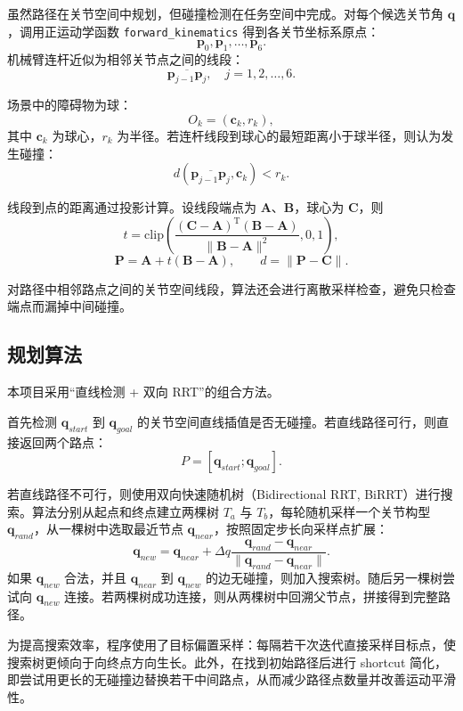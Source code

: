 \documentclass[UTF8,a4paper,12pt]{ctexart}
\begin{document}
虽然路径在关节空间中规划，但碰撞检测在任务空间中完成。对每个候选关节角 $\mathbf{q}$，调用正运动学函数 \texttt{forward\_kinematics} 得到各关节坐标系原点：
\[
    \mathbf{p}_0,\mathbf{p}_1,\ldots,\mathbf{p}_6.
\]
机械臂连杆近似为相邻关节点之间的线段：
\[
    \overline{\mathbf{p}_{j-1}\mathbf{p}_{j}}, \quad j=1,2,\ldots,6.
\]

场景中的障碍物为球：
\[
    O_k = (\mathbf{c}_k, r_k),
\]
其中 $\mathbf{c}_k$ 为球心，$r_k$ 为半径。若连杆线段到球心的最短距离小于球半径，则认为发生碰撞：
\[
    d(\overline{\mathbf{p}_{j-1}\mathbf{p}_{j}}, \mathbf{c}_k) < r_k.
\]

线段到点的距离通过投影计算。设线段端点为 $\mathbf{A}$、$\mathbf{B}$，球心为 $\mathbf{C}$，则
\[
    t = \mathrm{clip}\left(
    \frac{(\mathbf{C}-\mathbf{A})^\mathrm{T}(\mathbf{B}-\mathbf{A})}
    {\|\mathbf{B}-\mathbf{A}\|^2}, 0, 1
    \right),
\]
\[
    \mathbf{P} = \mathbf{A} + t(\mathbf{B}-\mathbf{A}),
    \qquad
    d = \|\mathbf{P}-\mathbf{C}\|.
\]

对路径中相邻路点之间的关节空间线段，算法还会进行离散采样检查，避免只检查端点而漏掉中间碰撞。

\subsection{规划算法}

本项目采用“直线检测 + 双向 RRT”的组合方法。

首先检测 $\mathbf{q}_{start}$ 到 $\mathbf{q}_{goal}$ 的关节空间直线插值是否无碰撞。若直线路径可行，则直接返回两个路点：
\[
    P = [\mathbf{q}_{start}; \mathbf{q}_{goal}].
\]

若直线路径不可行，则使用双向快速随机树（Bidirectional RRT, BiRRT）进行搜索。算法分别从起点和终点建立两棵树 $T_a$ 与 $T_b$，每轮随机采样一个关节构型 $\mathbf{q}_{rand}$，从一棵树中选取最近节点 $\mathbf{q}_{near}$，按照固定步长向采样点扩展：
\[
    \mathbf{q}_{new}
    =
    \mathbf{q}_{near}
    +
    \Delta q
    \frac{\mathbf{q}_{rand}-\mathbf{q}_{near}}
    {\|\mathbf{q}_{rand}-\mathbf{q}_{near}\|}.
\]
如果 $\mathbf{q}_{new}$ 合法，并且 $\mathbf{q}_{near}$ 到 $\mathbf{q}_{new}$ 的边无碰撞，则加入搜索树。随后另一棵树尝试向 $\mathbf{q}_{new}$ 连接。若两棵树成功连接，则从两棵树中回溯父节点，拼接得到完整路径。

为提高搜索效率，程序使用了目标偏置采样：每隔若干次迭代直接采样目标点，使搜索树更倾向于向终点方向生长。此外，在找到初始路径后进行 shortcut 简化，即尝试用更长的无碰撞边替换若干中间路点，从而减少路径点数量并改善运动平滑性。
\end{document}
